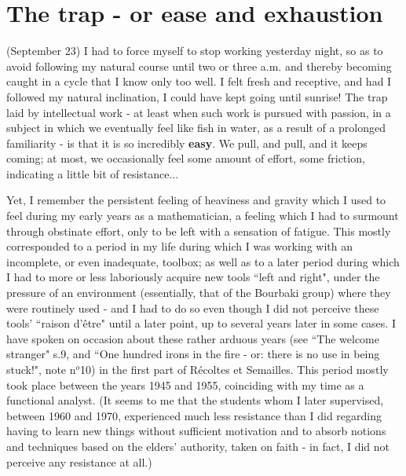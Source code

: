 \section{The trap - or ease and exhaustion}

\label{note:99} (September 23) I had to force myself to stop working yesterday night, so as to avoid following my natural course until two or three a.m. and thereby becoming caught in a cycle that I know only too well. I felt fresh and receptive, and had I followed my natural inclination, I could have kept going until sunrise! The trap laid by intellectual work - at least when such work is pursued with passion, in a subject in which we eventually feel like fish in water, as a result of a prolonged familiarity - is that it is so incredibly \textbf{easy}. We pull, and pull, and it keeps coming; at most, we occasionally feel some amount of effort, some friction, indicating a little bit of resistance...

Yet, I remember the persistent feeling of heaviness and gravity which I used to feel during my early years as a mathematician, a feeling which I had to surmount through obstinate effort, only to be left with a sensation of fatigue. This mostly corresponded to a period in my life during which I was working with an incomplete, or even inadequate, toolbox; as well as to a later period during which I had to more or less laboriously acquire new tools ``left and right", under the pressure of an environment (essentially, that of the Bourbaki group) where they were routinely used - and I had to do so even though I did not perceive these tools' ``raison d'\^etre" until a later point, up to several years later in some cases. I have spoken on occasion about these rather arduous years (see ``The welcome stranger" s.9, and ``One hundred irons in the fire - or: there is no use in being stuck!", note n$^o$10) in the first part of R\'ecoltes et Semailles. This period mostly took place between the years 1945 and 1955, coinciding with my time as a functional analyst. (It seems to me that the students whom I later supervised, between 1960 and 1970, experienced much less resistance than I did regarding having to learn new things without sufficient motivation and to absorb notions and techniques based on the elders' authority, taken on faith - in fact, I did not perceive any resistance at all.)

